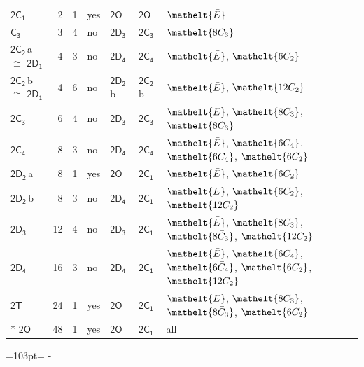 \documentclass[10pt,a4paper]{article}
\newcommand{\needspace}[1]{\par\penalty-100\begingroup\dimen0=#1\relax\dimen2=\pagegoal
  \advance\dimen2-\pagetotal\ifdim\dimen0>\dimen2\relax\ifdim\dimen2>0pt\vfil\break\fi\fi
  \endgroup}
\numberwithin{equation}{section}
\newcommand{\eltfont}[1]{{\let\sigma\eltsigma\mathelt{#1}}}
\newcommand{\grp}[1]{\mathsf{#1}}
\newcommand{\cls}[1]{\eltfont{#1}}
\newcommand{\samecls}{\cong}
\newcommand{\clsletter}[1]{\,{\scriptsize\color{black!55}#1}}
\newcommand{\barred}[1]{\bar{#1}}
\newlength{\fillwidth}\newlength{\cellwidth}\newlength{\colwidth}
\begin{document}
{\begin{longtable}{@{}lrrlll>{\RaggedRight\arraybackslash}p{\fillwidth}@{}}
\href{2C1.pdf}{$\grp{2C_{1}}$} & 2 & 1 & yes & \href{2O.pdf}{$\grp{2O}$} & \href{2O.pdf}{$\grp{2O}$} & $\cls{\barred{E}}$\\
\href{C3.pdf}{$\grp{C_{3}}$} & 3 & 4 & no & \href{2D3.pdf}{$\grp{2D_{3}}$} & \href{2C3.pdf}{$\grp{2C_{3}}$} & $\cls{8\barred{C}_{3}}$\\
\href{2C2.pdf}{$\grp{2C_{2}}$}\clsletter{a} $\samecls$ \href{2D1.pdf}{$\grp{2D_{1}}$} & 4 & 3 & no & \href{2D4.pdf}{$\grp{2D_{4}}$} & \href{2C4.pdf}{$\grp{2C_{4}}$} & $\cls{\barred{E}}$, $\cls{6C_{2}}$\\
\href{2C2.pdf}{$\grp{2C_{2}}$}\clsletter{b} $\samecls$ \href{2D1.pdf}{$\grp{2D_{1}}$} & 4 & 6 & no & \href{2D2.pdf}{$\grp{2D_{2}}$}\clsletter{b} & \href{2C2.pdf}{$\grp{2C_{2}}$}\clsletter{b} & $\cls{\barred{E}}$, $\cls{12C_{2}}$\\
\href{2C3.pdf}{$\grp{2C_{3}}$} & 6 & 4 & no & \href{2D3.pdf}{$\grp{2D_{3}}$} & \href{2C3.pdf}{$\grp{2C_{3}}$} & $\cls{\barred{E}}$, $\cls{8C_{3}}$, $\cls{8\barred{C}_{3}}$\\
\href{2C4.pdf}{$\grp{2C_{4}}$} & 8 & 3 & no & \href{2D4.pdf}{$\grp{2D_{4}}$} & \href{2C4.pdf}{$\grp{2C_{4}}$} & $\cls{\barred{E}}$, $\cls{6C_{4}}$, $\cls{6\barred{C}_{4}}$, $\cls{6C_{2}}$\\
\href{2D2.pdf}{$\grp{2D_{2}}$}\clsletter{a} & 8 & 1 & yes & \href{2O.pdf}{$\grp{2O}$} & \href{2C1.pdf}{$\grp{2C_{1}}$} & $\cls{\barred{E}}$, $\cls{6C_{2}}$\\
\href{2D2.pdf}{$\grp{2D_{2}}$}\clsletter{b} & 8 & 3 & no & \href{2D4.pdf}{$\grp{2D_{4}}$} & \href{2C1.pdf}{$\grp{2C_{1}}$} & $\cls{\barred{E}}$, $\cls{6C_{2}}$, $\cls{12C_{2}}$\\
\href{2D3.pdf}{$\grp{2D_{3}}$} & 12 & 4 & no & \href{2D3.pdf}{$\grp{2D_{3}}$} & \href{2C1.pdf}{$\grp{2C_{1}}$} & $\cls{\barred{E}}$, $\cls{8C_{3}}$, $\cls{8\barred{C}_{3}}$, $\cls{12C_{2}}$\\
\href{2D4.pdf}{$\grp{2D_{4}}$} & 16 & 3 & no & \href{2D4.pdf}{$\grp{2D_{4}}$} & \href{2C1.pdf}{$\grp{2C_{1}}$} & $\cls{\barred{E}}$, $\cls{6C_{4}}$, $\cls{6\barred{C}_{4}}$, $\cls{6C_{2}}$, $\cls{12C_{2}}$\\
\href{2T.pdf}{$\grp{2T}$} & 24 & 1 & yes & \href{2O.pdf}{$\grp{2O}$} & \href{2C1.pdf}{$\grp{2C_{1}}$} & $\cls{\barred{E}}$, $\cls{8C_{3}}$, $\cls{8\barred{C}_{3}}$, $\cls{6C_{2}}$\\*
\href{2O.pdf}{$\grp{2O}$} & 48 & 1 & yes & \href{2O.pdf}{$\grp{2O}$} & \href{2C1.pdf}{$\grp{2C_{1}}$} & all\\
\bottomrule\end{longtable}}
\needspace{103pt}
\end{document}
